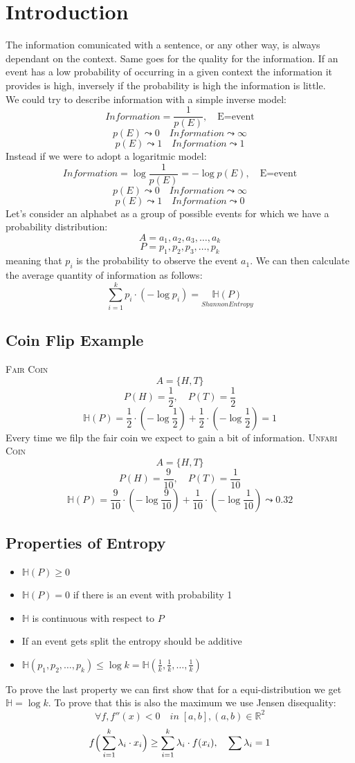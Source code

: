 \section{Introduction}
The information comunicated with a sentence, or any other way, is always dependant on the context. Same goes for the quality for the information. If an event has a low probability of occurring in a given context the information it provides is high, inversely if the probability is high the information is little.\\
We could try to describe information with a simple inverse model:
$$ Information = \frac{1}{p(E)}, \quad \text{E=event}$$
$$p(E)\leadsto 0 \quad Information \leadsto \infty$$
$$p(E)\leadsto 1 \quad Information \leadsto 1$$
Instead if we were to adopt a logaritmic model:
$$Information = \log{\frac{1}{p(E)}}=-\log{p(E)}, \quad \text{E=event}$$
$$p(E)\leadsto 0 \quad Information \leadsto \infty$$
$$p(E)\leadsto 1 \quad Information \leadsto 0$$
Let's consider an alphabet as a group of possible events for which we have a probability distribution:
$$A={a_1,a_2,a_3,\ldots,a_k}$$
$$P={p_1,p_2,p_3,\ldots,p_k}$$
meaning that $p_i$ is the probability to observe the event $a_1$. We can then calculate the average quantity of information as follows:
\begin{equation}
    \sum_{i=1}^{k}{p_i\cdot (-\log{p_i})} = \underset{Shannon Entropy}{\mathbb{H}(P)}
\end{equation}
\subsection{Coin Flip Example}
\textsc{Fair Coin}
$$A=\{H,T\}$$
$$P(H)=\frac{1}{2},\quad P(T)=\frac{1}{2}$$
$$\mathbb{H}(P)=\frac{1}{2}\cdot(-\log{\frac{1}{2}})+\frac{1}{2}\cdot(-\log{\frac{1}{2}})=1$$
Every time we filp the fair coin we expect to gain a bit of information.
\textsc{Unfari Coin}
$$A=\{H,T\}$$
$$P(H)=\frac{9}{10},\quad P(T)=\frac{1}{10}$$
$$\mathbb{H}(P)=\frac{9}{10}\cdot(-\log{\frac{9}{10}})+\frac{1}{10}\cdot(-\log{\frac{1}{10}})\leadsto 0.32$$
\subsection{Properties of Entropy}
\begin{itemize}
    \item $\mathbb{H}(P)\geq 0$
    \item $\mathbb{H}(P) = 0$ if there is an event with probability 1
    \item $\mathbb{H}$ is continuous with respect to $P$
    \item If an event gets split the entropy should be additive
    \item $\mathbb{H}(p_1,p_2,\ldots,p_k)\leq \log{k}= \mathbb{H}(\frac{1}{k},\frac{1}{k},\ldots,\frac{1}{k})$
\end{itemize}
To prove the last property we can first show that for a equi-distribution we get $\mathbb{H}=\log{k}$. To prove that this is also the maximum we use Jensen disequality:
$$\forall f, f''(x)<0 \quad in\;[a,b], (a,b)\in \mathbb{R}^2$$
$$f\Big{(}\sum_{i=1}^{k}{\lambda_i\cdot x_i}\Big{)}\geq\sum_{i=1}^{k}{\lambda_i\cdot f(x_i)}, \quad \sum{\lambda_i} = 1$$